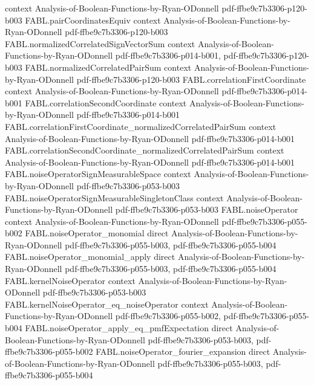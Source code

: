 \begin{theorem}
  {context}
  {Analysis-of-Boolean-Functions-by-Ryan-ODonnell}
  {pdf-ffbe9c7b3306-p120-b003}
\proofstep
  {FABL.pairCoordinatesEquiv}
  {context}
  {Analysis-of-Boolean-Functions-by-Ryan-ODonnell}
  {pdf-ffbe9c7b3306-p120-b003}
\proofstep
  {FABL.normalizedCorrelatedSignVectorSum}
  {context}
  {Analysis-of-Boolean-Functions-by-Ryan-ODonnell}
  {pdf-ffbe9c7b3306-p014-b001,
    pdf-ffbe9c7b3306-p120-b003}
\proofstep
  {FABL.normalizedCorrelatedPairSum}
  {context}
  {Analysis-of-Boolean-Functions-by-Ryan-ODonnell}
  {pdf-ffbe9c7b3306-p120-b003}
\proofstep
  {FABL.correlationFirstCoordinate}
  {context}
  {Analysis-of-Boolean-Functions-by-Ryan-ODonnell}
  {pdf-ffbe9c7b3306-p014-b001}
\proofstep
  {FABL.correlationSecondCoordinate}
  {context}
  {Analysis-of-Boolean-Functions-by-Ryan-ODonnell}
  {pdf-ffbe9c7b3306-p014-b001}
\proofstep
  {FABL.correlationFirstCoordinate_normalizedCorrelatedPairSum}
  {context}
  {Analysis-of-Boolean-Functions-by-Ryan-ODonnell}
  {pdf-ffbe9c7b3306-p014-b001}
\proofstep
  {FABL.correlationSecondCoordinate_normalizedCorrelatedPairSum}
  {context}
  {Analysis-of-Boolean-Functions-by-Ryan-ODonnell}
  {pdf-ffbe9c7b3306-p014-b001}
\proofstep
  {FABL.noiseOperatorSignMeasurableSpace}
  {context}
  {Analysis-of-Boolean-Functions-by-Ryan-ODonnell}
  {pdf-ffbe9c7b3306-p053-b003}
\proofstep
  {FABL.noiseOperatorSignMeasurableSingletonClass}
  {context}
  {Analysis-of-Boolean-Functions-by-Ryan-ODonnell}
  {pdf-ffbe9c7b3306-p053-b003}
\proofstep
  {FABL.noiseOperator}
  {context}
  {Analysis-of-Boolean-Functions-by-Ryan-ODonnell}
  {pdf-ffbe9c7b3306-p055-b002}
\proofstep
  {FABL.noiseOperator_monomial}
  {direct}
  {Analysis-of-Boolean-Functions-by-Ryan-ODonnell}
  {pdf-ffbe9c7b3306-p055-b003,
    pdf-ffbe9c7b3306-p055-b004}
\proofstep
  {FABL.noiseOperator_monomial_apply}
  {direct}
  {Analysis-of-Boolean-Functions-by-Ryan-ODonnell}
  {pdf-ffbe9c7b3306-p055-b003,
    pdf-ffbe9c7b3306-p055-b004}
\proofstep
  {FABL.kernelNoiseOperator}
  {context}
  {Analysis-of-Boolean-Functions-by-Ryan-ODonnell}
  {pdf-ffbe9c7b3306-p053-b003}
\proofstep
  {FABL.kernelNoiseOperator_eq_noiseOperator}
  {context}
  {Analysis-of-Boolean-Functions-by-Ryan-ODonnell}
  {pdf-ffbe9c7b3306-p055-b002,
    pdf-ffbe9c7b3306-p055-b004}
\proofstep
  {FABL.noiseOperator_apply_eq_pmfExpectation}
  {direct}
  {Analysis-of-Boolean-Functions-by-Ryan-ODonnell}
  {pdf-ffbe9c7b3306-p053-b003,
    pdf-ffbe9c7b3306-p055-b002}
\proofstep
  {FABL.noiseOperator_fourier_expansion}
  {direct}
  {Analysis-of-Boolean-Functions-by-Ryan-ODonnell}
  {pdf-ffbe9c7b3306-p055-b003,
    pdf-ffbe9c7b3306-p055-b004}

\end{theorem}
